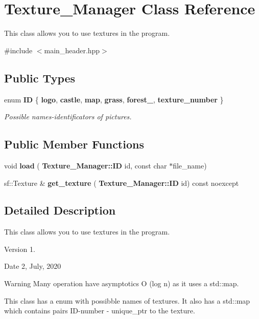 \section{Texture\+\_\+\+Manager Class Reference}
\label{class_texture___manager}


This class allows you to use textures in the program.  




{\ttfamily \#include $<$main\+\_\+header.\+hpp$>$}

\subsection*{Public Types}
\begin{DoxyCompactItemize}
\item 
enum \textbf{ ID} \{ \newline
{\bfseries logo}, 
{\bfseries castle}, 
{\bfseries map}, 
{\bfseries grass}, 
\newline
{\bfseries forest\+\_}, 
\textbf{ texture\+\_\+number}
 \}\begin{DoxyCompactList}\small\item\em Possible names-\/identificators of pictures. \end{DoxyCompactList}
\end{DoxyCompactItemize}
\subsection*{Public Member Functions}
\begin{DoxyCompactItemize}
\item 
void \textbf{ load} (\textbf{ Texture\+\_\+\+Manager\+::\+ID} id, const char $\ast$file\+\_\+name)
\item 
sf\+::\+Texture \& \textbf{ get\+\_\+texture} (\textbf{ Texture\+\_\+\+Manager\+::\+ID} id) const noexcept
\end{DoxyCompactItemize}


\subsection{Detailed Description}
This class allows you to use textures in the program. 

\begin{DoxyVersion}{Version}
1. 
\end{DoxyVersion}
\begin{DoxyDate}{Date}
2, July, 2020 
\end{DoxyDate}
\begin{DoxyWarning}{Warning}
Many operation have asymptotics O (log n) as it uses a std\+::map.
\end{DoxyWarning}
This class has a enum with possibble names of textures. It also has a std\+::map which contains pairs I\+D-\/number -\/ unique\+\_\+ptr to the texture. 

